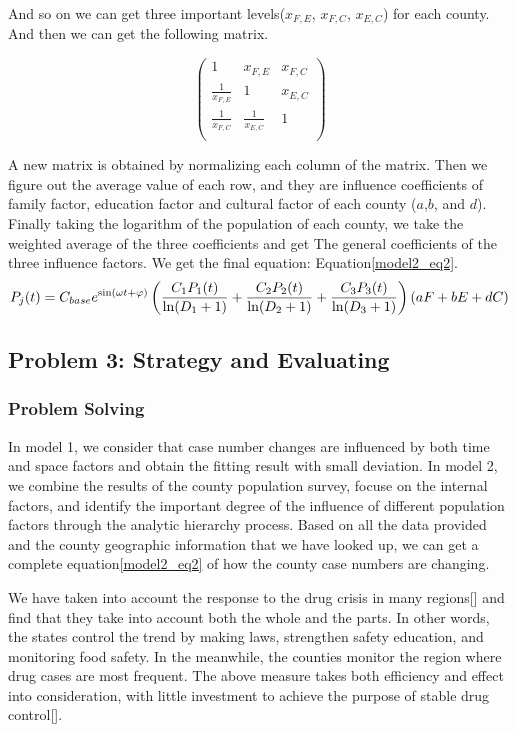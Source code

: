 \documentclass{mcmthesis}
\begin{document}
And so on we can get three important levels($x_{F,E}$, $x_{F,C}$, $x_{E,C}$) for each county. And then we can get the following matrix.

\[
\begin{pmatrix}
{1 } & {x_{F,E} } & {x_{F,C} }  \\
{\frac{1}{x_{F,E}}} & {1 } & {x_{E,C} }  \\
{\frac{1}{x_{F,C} } } & {\frac{1}{x_{E,C}} } & {1}  \\
\end{pmatrix}
\]

A new matrix is obtained by normalizing each column of the matrix. Then we figure out the average value of each row, and they are influence coefficients of family factor, education factor and cultural factor of each county ($a$,$b$, and $d$). Finally taking the logarithm of the population of each county, we take the weighted average of the three coefficients and get The general coefficients of the three influence factors. We get the final equation: Equation\eqref{model2_eq2}.
\begin{equation}
P_{j}(t) = C_{base} e^{\sin (\omega t+\varphi)} \left(\frac{C_1 P_1(t)}{\ln (D_1+1)}+\frac{C_2 P_2(t)}{\ln (D_2+1)}+\frac{C_3 P_3(t)}{\ln (D_3+1)}\right)\left(a\*F+b\*E+d\*C\right)
\label{model2_eq2}
\end{equation}

\subsection{Problem 3: Strategy and Evaluating}
\subsubsection{Problem Solving}
In model 1, we consider that case number changes are influenced by both time and space factors and obtain the fitting result with small deviation. In model 2, we combine the results of the county population survey, focuse on the internal factors, and identify the important degree of the influence of different population factors through the analytic hierarchy process. Based on all the data provided and the county geographic information that we have looked up, we can get a complete equation\eqref{model2_eq2} of how the county case numbers are changing.

We have taken into account the response to the drug crisis in many regions[\cite{9}] and find that they take into account both the whole and the parts. In other words, the states control the trend by making laws, strengthen safety education, and monitoring food safety. In the meanwhile, the counties monitor the region where drug cases are most frequent. The above measure takes both efficiency and effect into consideration, with little investment to achieve the purpose of stable drug control[\cite{10}].
\end{document}
